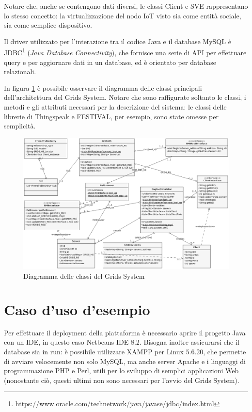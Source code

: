 Notare che, anche se contengono dati diversi, le classi Client e SVE rappresentano lo stesso concetto: la virtualizzazione del nodo IoT visto sia come entità sociale, sia come semplice dispositivo.

Il driver utilizzato per l'interazione tra il codice Java e il database MySQL è JDBC\footnote{https://www.oracle.com/technetwork/java/javase/jdbc/index.html} (\textit{Java Database Connectivity}), che fornisce una serie di API per effettuare query e per aggiornare dati in un database, ed è orientato per database relazionali.

In figura \ref{f:grids:diagramma} è possibile osservare il diagramma delle classi principali dell'architettura del Grids System. Notare che sono raffigurate soltanto le classi, i metodi e gli attributi necessari per la descrizione del sistema: le classi delle librerie di Thingspeak e FESTIVAL, per esempio, sono state omesse per semplicità.


\begin{figure}[h!t]
\centerline{\includegraphics[width=\textwidth]{img/initialDiagramCorrect}}
\caption{Diagramma delle classi del Grids System}
\label{f:grids:diagramma}
\end{figure}


\section{Caso d'uso d'esempio}
\label{c:grids:usecase}

Per effettuare il deployment della piattaforma è necessario aprire il progetto Java con un IDE, in questo caso Netbeans IDE 8.2. Bisogna inoltre assicurarsi che il database sia in run: è possibile utilizzare XAMPP per Linux 5.6.20, che permette di avviare velocemente non solo MySQL, ma anche server Apache e i linguaggi di programmazione PHP e Perl, utili per lo sviluppo di semplici applicazioni Web (nonostante ciò, questi ultimi non sono necessari per l'avvio del Grids System). 

